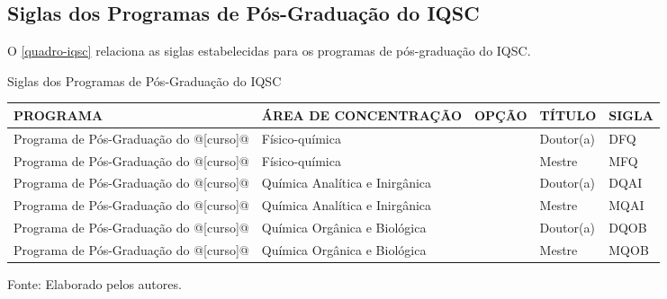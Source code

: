 \begin{apendicesenv}
\chapter{Siglas dos Programas de Pós-Graduação do IQSC}
O \autoref{quadro-iqsc} relaciona as siglas estabelecidas para os programas de pós-graduação do IQSC.
\begin{quadro}[htb]
\ABNTEXfontereduzida
\caption[Siglas dos Programas de Pós-Graduação do IQSC]{Siglas dos Programas de Pós-Graduação do IQSC}
\label{quadro-iqsc}
\begin{tabular}{|p{3.5cm}|p{3.5cm}|p{3.5cm}|p{1.5cm}|p{2.25cm}|}
  \hline
   \textbf{PROGRAMA} & \textbf{ÁREA DE CONCENTRAÇÃO} & \textbf{OPÇÃO} & \textbf{TÍTULO} & \textbf{SIGLA}  \\
    \hline
Programa de Pós-Graduação do @[curso]@& Físico-química &  & Doutor(a) & DFQ\\
Programa de Pós-Graduação do @[curso]@& Físico-química &  & Mestre & MFQ\\
Programa de Pós-Graduação do @[curso]@& Química Analítica e Inirg\^anica &  & Doutor(a) & DQAI\\
Programa de Pós-Graduação do @[curso]@& Química Analítica e Inirg\^anica &  & Mestre & MQAI\\
Programa de Pós-Graduação do @[curso]@& Química Org\^anica e Biológica &  & Doutor(a) & DQOB\\
Programa de Pós-Graduação do @[curso]@& Química Org\^anica e Biológica &  & Mestre & MQOB\\
\hline

\end{tabular}
\begin{flushleft}
		Fonte: Elaborado pelos autores.\
\end{flushleft}
\end{quadro}


\end{apendicesenv}
